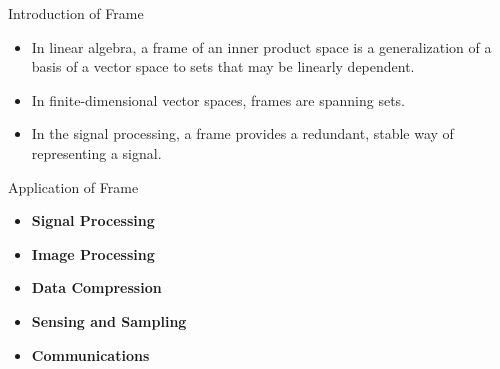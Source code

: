 \documentclass{beamer}
\begin{document}
\begin{frame}{Introduction of Frame}
  \begin{itemize}
    
    \item In linear algebra, a frame of an inner product space is a generalization of a basis of a vector space to sets that may be linearly dependent.\cite{kovavcevic2008introduction}
    
    \item In finite-dimensional vector spaces, frames are spanning sets.
    \item In the signal processing, a frame provides a redundant, stable way of representing a signal.\cite{goyal2001quantized}
    
  \end{itemize}
\end{frame}

\begin{frame}{Application of Frame}
  \begin{itemize}

  \item \textbf{Signal Processing}
  
  \item \textbf{Image Processing}
  
  \item \textbf{Data Compression}
  
  \item \textbf{Sensing and Sampling}
  
  \item \textbf{Communications}
  \end{itemize}
\end{frame}
\end{document}
